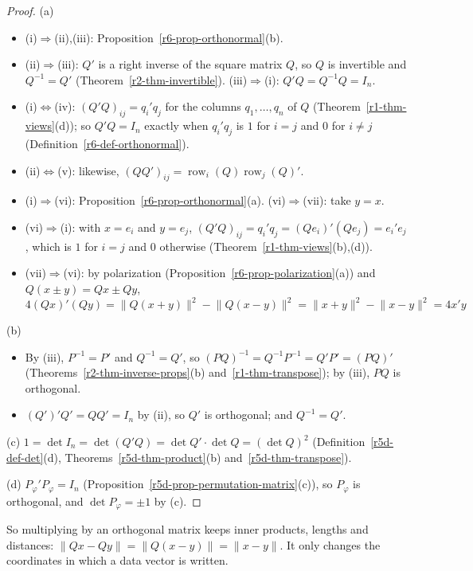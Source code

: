 \documentclass[12pt]{article}
\DeclareMathOperator{\row}{row}
\theoremstyle{definition}
\begin{document}
\begin{proof}
(a)
\begin{itemize}
\item (i)\(\Rightarrow\)(ii),(iii): Proposition~\ref{r6-prop-orthonormal}(b).
\item (ii)\(\Rightarrow\)(iii): \(Q'\) is a right inverse of the square matrix \(Q\), so \(Q\) is invertible and
\(Q^{-1}=Q'\) (Theorem~\ref{r2-thm-invertible}). (iii)\(\Rightarrow\)(i): \(Q'Q=Q^{-1}Q=I_n\).
\item (i)\(\Leftrightarrow\)(iv): \((Q'Q)_{ij}=q_i'q_j\) for the columns \(q_1,\dots,q_n\) of \(Q\)
(Theorem~\ref{r1-thm-views}(d)); so \(Q'Q=I_n\) exactly when \(q_i'q_j\) is \(1\) for \(i=j\) and \(0\) for
\(i\ne j\) (Definition~\ref{r6-def-orthonormal}).
\item (ii)\(\Leftrightarrow\)(v): likewise, \((QQ')_{ij}=\row_i(Q)\row_j(Q)'\).
\item (i)\(\Rightarrow\)(vi): Proposition~\ref{r6-prop-orthonormal}(a). (vi)\(\Rightarrow\)(vii): take \(y=x\).
\item (vi)\(\Rightarrow\)(i): with \(x=e_i\) and \(y=e_j\), \((Q'Q)_{ij}=q_i'q_j=(Qe_i)'(Qe_j)=e_i'e_j\), which is
\(1\) for \(i=j\) and \(0\) otherwise (Theorem~\ref{r1-thm-views}(b),(d)).
\item (vii)\(\Rightarrow\)(vi): by polarization (Proposition~\ref{r6-prop-polarization}(a)) and
\(Q(x\pm y)=Qx\pm Qy\),
\[
4(Qx)'(Qy)=\lVert Q(x+y)\rVert^2-\lVert Q(x-y)\rVert^2=\lVert x+y\rVert^2-\lVert x-y\rVert^2=4x'y
\]
\end{itemize}
(b)
\begin{itemize}
\item By (iii), \(P^{-1}=P'\) and \(Q^{-1}=Q'\), so \((PQ)^{-1}=Q^{-1}P^{-1}=Q'P'=(PQ)'\)
(Theorems~\ref{r2-thm-inverse-props}(b) and~\ref{r1-thm-transpose}); by (iii), \(PQ\) is orthogonal.
\item \((Q')'Q'=QQ'=I_n\) by (ii), so \(Q'\) is orthogonal; and \(Q^{-1}=Q'\).
\end{itemize}
(c) \(1=\det I_n=\det(Q'Q)=\det Q'\cdot\det Q=(\det Q)^2\) (Definition~\ref{r5d-def-det}(d),
Theorems~\ref{r5d-thm-product}(b) and~\ref{r5d-thm-transpose}).

(d) \(P_\varphi'P_\varphi=I_n\) (Proposition~\ref{r5d-prop-permutation-matrix}(c)), so \(P_\varphi\) is orthogonal, and
\(\det P_\varphi=\pm1\) by (c).
\end{proof}
So multiplying by an orthogonal matrix keeps inner products, lengths and distances:
\(\lVert Qx-Qy\rVert=\lVert Q(x-y)\rVert=\lVert x-y\rVert\). It only changes the coordinates in which a data vector
is written.
\end{document}
